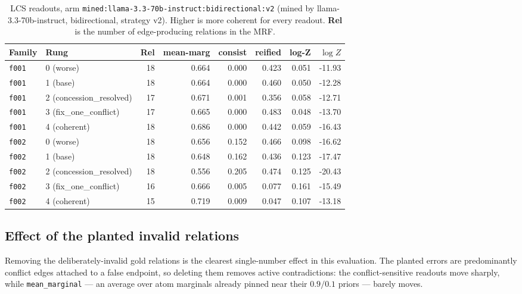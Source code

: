\documentclass[11pt]{article}
\begin{document}
\begin{table}[htbp]
\centering
\small
\caption{LCS readouts, arm \texttt{mined:llama-3.3-70b-instruct:bidirectional:v2} (mined by llama-3.3-70b-instruct, bidirectional, strategy v2). Higher is more coherent for every readout. \textbf{Rel} is the number of edge-producing relations in the MRF.}
\label{tab:scores-mined-llama-3-3-70b-instruct-bidirectional-v2}
\begin{tabular}{llrrrrrr}
\toprule
Family & Rung & Rel & \textbf{mean-marg} & \textbf{consist} & \textbf{reified} & \textbf{log-Z} & $\log Z$ \\
\midrule
\texttt{f001} & 0 (worse) & 18 & 0.664 & 0.000 & 0.423 & 0.051 & -11.93 \\
\texttt{f001} & 1 (base) & 18 & 0.664 & 0.000 & 0.460 & 0.050 & -12.28 \\
\texttt{f001} & 2 (concession\_resolved) & 17 & 0.671 & 0.001 & 0.356 & 0.058 & -12.71 \\
\texttt{f001} & 3 (fix\_one\_conflict) & 17 & 0.665 & 0.000 & 0.483 & 0.048 & -13.70 \\
\texttt{f001} & 4 (coherent) & 18 & 0.686 & 0.000 & 0.442 & 0.059 & -16.43 \\
\midrule
\texttt{f002} & 0 (worse) & 18 & 0.656 & 0.152 & 0.466 & 0.098 & -16.62 \\
\texttt{f002} & 1 (base) & 18 & 0.648 & 0.162 & 0.436 & 0.123 & -17.47 \\
\texttt{f002} & 2 (concession\_resolved) & 18 & 0.556 & 0.205 & 0.474 & 0.125 & -20.43 \\
\texttt{f002} & 3 (fix\_one\_conflict) & 16 & 0.666 & 0.005 & 0.077 & 0.161 & -15.49 \\
\texttt{f002} & 4 (coherent) & 15 & 0.719 & 0.009 & 0.047 & 0.107 & -13.18 \\
\bottomrule
\end{tabular}
\end{table}

\subsection{Effect of the planted invalid relations}

Removing the deliberately-invalid gold relations is the clearest single-number effect in this evaluation. The planted errors are predominantly conflict edges attached to a false endpoint, so deleting them removes active contradictions: the conflict-sensitive readouts move sharply, while \texttt{mean\_marginal} --- an average over atom marginals already pinned near their $0.9/0.1$ priors --- barely moves.
\end{document}
